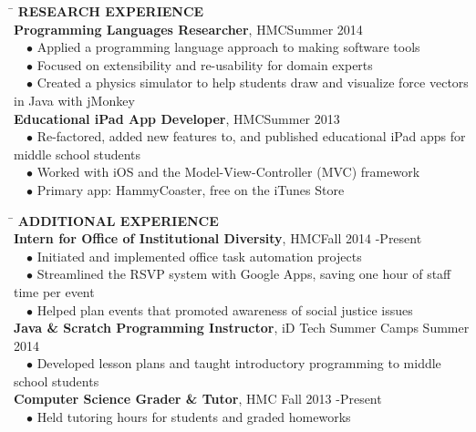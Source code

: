 \documentclass[11pt]{article}
\newcommand{\sectionNL}{\\[-2pt]}
\newcommand{\customtab}{$\hspace{10pt} \bullet \hspace{2pt}$}
\newcommand{\customtabinline}{$\hspace{23pt}$}
\newcommand{\HMC}{HMC}
\begin{document}
\begin{tabbing} 
\hspace*{6.5in}\= \kill
{\textbf{RESEARCH EXPERIENCE} } \> \sectionNL
\textbf{Programming Languages Researcher}, \HMC \>Summer 2014 \\
\customtab Applied a programming language approach to making software tools \\
\customtab Focused on extensibility and re-usability for domain experts \\ 
\customtab Created a physics simulator to help students draw and visualize force vectors in Java with jMonkey\\

\textbf{Educational iPad App Developer}, \HMC \>Summer 2013 \\
\customtab Re-factored, added new features to, and published educational iPad apps for middle school students \\
\customtab Worked with iOS and the Model-View-Controller (MVC) framework \\
\customtab Primary app: HammyCoaster, free on the iTunes Store
\end{tabbing}


\begin{tabbing} 
\hspace*{6.5in}\= \kill
{\textbf{ADDITIONAL EXPERIENCE } } \> \sectionNL
\textbf{Intern for Office of Institutional Diversity}, \HMC \>Fall 2014 -Present \\
\customtab Initiated and implemented office task automation projects\\
\customtab Streamlined the RSVP system with Google Apps, saving one hour of staff time per event  \\
\customtab Helped plan events that promoted awareness of social justice issues \\

\textbf{Java \& Scratch Programming Instructor}, iD Tech Summer Camps \> Summer 2014 \\
\customtab Developed lesson plans and taught introductory programming to  middle school students\\

\textbf{Computer Science Grader \& Tutor}, \HMC \> Fall 2013 -Present \\ %
\customtab Held tutoring hours for students and graded homeworks
\end{tabbing}
\end{document}
